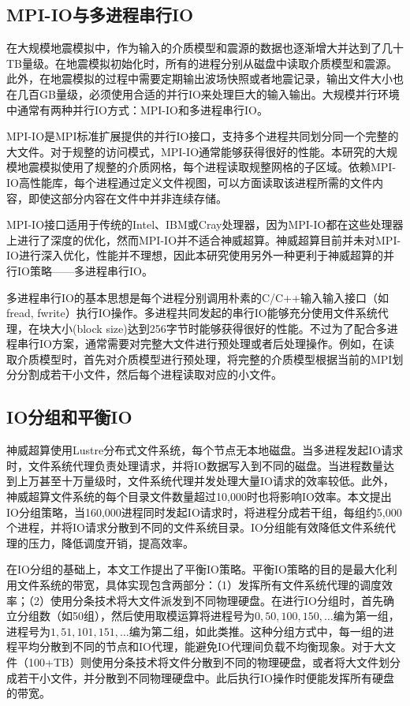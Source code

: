 \subsection{MPI-IO与多进程串行IO}

在大规模地震模拟中，作为输入的介质模型和震源的数据也逐渐增大并达到了几十TB量级。在地震模拟初始化时，所有的进程分别从磁盘中读取介质模型和震源。此外，在地震模拟的过程中需要定期输出波场快照或者地震记录，输出文件大小也在几百GB量级，必须使用合适的并行IO来处理巨大的输入输出。大规模并行环境中通常有两种并行IO方式：MPI-IO和多进程串行IO。

MPI-IO是MPI标准扩展提供的并行IO接口，支持多个进程共同划分同一个完整的大文件。对于规整的访问模式，MPI-IO通常能够获得很好的性能。本研究的大规模地震模拟使用了规整的介质网格，每个进程读取规整网格的子区域。依赖MPI-IO高性能库，每个进程通过定义文件视图，可以方面读取该进程所需的文件内容，即使这部分内容在文件中并非连续存储。

MPI-IO接口适用于传统的Intel、IBM或Cray处理器，因为MPI-IO都在这些处理器上进行了深度的优化，然而MPI-IO并不适合神威超算。神威超算目前并未对MPI-IO进行深入优化，性能并不理想，因此本研究使用另外一种更利于神威超算的并行IO策略——多进程串行IO。

多进程串行IO的基本思想是每个进程分别调用朴素的C/C++输入输入接口（如fread, fwrite）执行IO操作。多进程共同发起的串行IO能够充分使用文件系统代理，在块大小(block size)达到256字节时能够获得很好的性能。不过为了配合多进程串行IO方案，通常需要对完整大文件进行预处理或者后处理操作。例如，在读取介质模型时，首先对介质模型进行预处理，将完整的介质模型根据当前的MPI划分分割成若干小文件，然后每个进程读取对应的小文件。

\subsection{IO分组和平衡IO}

神威超算使用Lustre分布式文件系统，每个节点无本地磁盘。当多进程发起IO请求时，文件系统代理负责处理请求，并将IO数据写入到不同的磁盘。当进程数量达到上万甚至十万量级时，文件系统代理并发处理大量IO请求的效率较低。此外，神威超算文件系统的每个目录文件数量超过10,000时也将影响IO效率。本文提出IO分组策略，当160,000进程同时发起IO请求时，将进程分成若干组，每组约5,000个进程，并将IO请求分散到不同的文件系统目录。IO分组能有效降低文件系统代理的压力，降低调度开销，提高效率。

在IO分组的基础上，本文工作提出了平衡IO策略。平衡IO策略的目的是最大化利用文件系统的带宽，具体实现包含两部分：（1）发挥所有文件系统代理的调度效率；（2）使用分条技术将大文件派发到不同物理硬盘。在进行IO分组时，首先确立分组数（如50组），然后使用取模运算将进程号为$0,50,100,150,\ldots$编为第一组，进程号为$1,51,101,151,\ldots$编为第二组，如此类推。这种分组方式中，每一组的进程平均分散到不同的节点和IO代理，能避免IO代理间负载不均衡现象。对于大文件（100+TB）则使用分条技术将文件分散到不同的物理硬盘，或者将大文件划分成若干小文件，并分散到不同物理硬盘中。此后执行IO操作时便能发挥所有硬盘的带宽。


